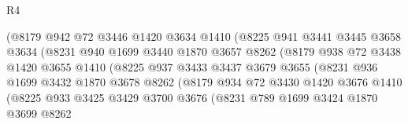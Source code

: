 \begin{lexlean}{R4}
\begin{coremodule}
                            (@8179
                              @942
                              @72
                              @3446
                              @1420
                              @3634
                              @1410
                              (@8225
                                @941
                                @3441
                                @3445
                                @3658
                                @3634
                                (@8231
                                  @940
                                  @1699
                                  @3440
                                  @1870
                                  @3657
                                  @8262
                                  (@8179
                                    @938
                                    @72
                                    @3438
                                    @1420
                                    @3655
                                    @1410
                                    (@8225
                                      @937
                                      @3433
                                      @3437
                                      @3679
                                      @3655
                                      (@8231
                                        @936
                                        @1699
                                        @3432
                                        @1870
                                        @3678
                                        @8262
                                        (@8179
                                          @934
                                          @72
                                          @3430
                                          @1420
                                          @3676
                                          @1410
                                          (@8225
                                            @933
                                            @3425
                                            @3429
                                            @3700
                                            @3676
                                            (@8231
                                              @789
                                              @1699
                                              @3424
                                              @1870
                                              @3699
                                              @8262

\end{coremodule}
\end{lexlean}

